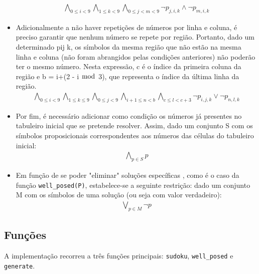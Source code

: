 \documentclass[a4paper,12pt]{article}
\newcommand{\code}[1]{\texttt{#1}}
\begin{document}
\begin{itemize}
         \begin{align}
         \bigwedge_{0\leq i < 9} \bigwedge_{1\leq k < 9} 
            \bigwedge_{0\leq j < m < 9}
               \lnot p_{j,i,k} \land \lnot p_{m,i,k}
         \end{align}
     \item Adicionalmente a não haver repetições de números por linha e coluna,
        é preciso garantir que nenhum número se repete por região. Portanto,
        dado um determinado p\textunderscore i\textunderscore j\textunderscore
        k, os símbolos da mesma região que não estão na mesma linha e coluna
        (não foram abrangidos pelas condições anteriores) não poderão ter o
        mesmo número. Nesta expressão, c é o índice da primeira coluna da
        região e b = i+(2 - i $\bmod$ 3), que representa o índice da última
        linha da região.
     \begin{align}
        \bigwedge_{0\leq i < 9}
        \bigwedge_{1\leq k \leq 9}
        \bigwedge_{0\leq j < 9}
        \bigwedge_{i + 1 \leq n < b}
        \bigwedge_{c\leq l < c+3} \lnot p_{i,j,k} \lor \lnot p_{n,l,k}
     \end{align}
     
     \item Por fim, é necessário adicionar como condição os números já
        presentes no tabuleiro inicial que se pretende resolver. Assim, dado um
        conjunto S com os símbolos proposicionais correspondentes aos números
        das células do tabuleiro inicial: 
        \begin{align}
        \bigwedge_{p\in S} p
        \end{align}
     
     \item Em função de se poder "eliminar" soluções específicas , como é o
        caso da função \texttt{well\_posed(P)}, estabelece-se a seguinte
        restrição: dado um conjunto M com os símbolos de uma solução (ou seja
        com valor verdadeiro):
     \begin{align}
     \bigvee_{p\in M} \lnot p
     \end{align}
\end{itemize}

\subsection{Funções}
A implementação recorreu a três funções principais: \code{sudoku},
\code{well_posed} e \code{generate}.
\end{document}
